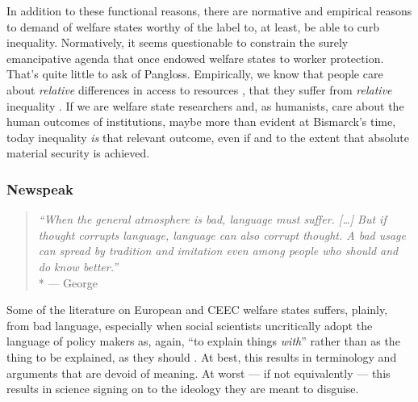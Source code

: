 \begin{enumerate}
	In addition to these functional reasons, there are normative and empirical reasons to demand of welfare states worthy of the label to, at least, be able to curb inequality.
	Normatively, it seems questionable to constrain the surely emancipative agenda that once endowed welfare states to worker protection.
	That's quite little to ask of Pangloss.
	Empirically, we know that people care about \emph{relative} differences in access to resources \citep{Frank2005}, that they suffer from \emph{relative} inequality \citep{Pickett-2009-kx}.
	If we are welfare state researchers and, as humanists, care about the human outcomes of institutions, maybe more than evident at Bismarck's time, today inequality \emph{is} that relevant outcome, even if and to the extent that absolute material security is achieved.
\end{enumerate}

\subsubsection[Newspeak]{Newspeak}
	\label{sec:newspeak}

\begin{quote}
	\emph{``When the general atmosphere is bad, language must suffer.
	[\ldots]
	But if thought corrupts language, language can also corrupt thought.
	A bad usage can spread by tradition and imitation even among people who should and do know better.''}
	\\*
	--- George \citet{Orwell1946}
\end{quote}

Some of the literature on European and \gls{CEEC} welfare states suffers, plainly, from bad language, especially when social scientists uncritically adopt the language of policy makers as, again, ``to explain things \emph{with}'' rather than as the thing to be explained, as they should \citep{Brubaker-2002-aa}.
At best, this results in terminology and arguments that are devoid of meaning.
At worst --- if not equivalently --- this results in science signing on to the ideology they are meant to disguise.



